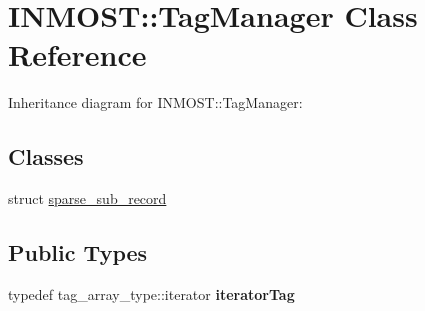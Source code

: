 \hypertarget{classINMOST_1_1TagManager}{\section{I\-N\-M\-O\-S\-T\-:\-:Tag\-Manager Class Reference}
\label{classINMOST_1_1TagManager}
}


Inheritance diagram for I\-N\-M\-O\-S\-T\-:\-:Tag\-Manager\-:
\subsection*{Classes}
\begin{DoxyCompactItemize}
\item 
struct \hyperlink{structINMOST_1_1TagManager_1_1sparse__sub__record}{sparse\-\_\-sub\-\_\-record}
\end{DoxyCompactItemize}
\subsection*{Public Types}
\begin{DoxyCompactItemize}
\item 
\hypertarget{classINMOST_1_1TagManager_adda9f59b50509dee56fa03697e1b4b02}{typedef tag\-\_\-array\-\_\-type\-::iterator {\bfseries iterator\-Tag}}\label{classINMOST_1_1TagManager_adda9f59b50509dee56fa03697e1b4b02}

\end{DoxyCompactItemize}
